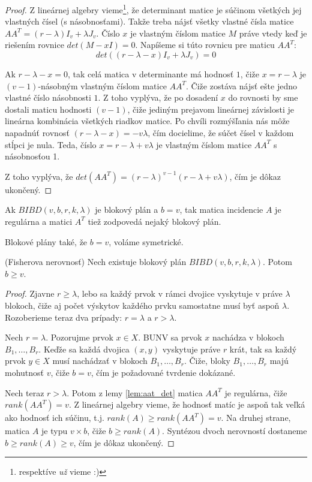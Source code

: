 \begin{proof}
Z lineárnej algebry vieme\footnote{respektíve \emph{už} vieme :)}, že determinant matice je súčinom všetkých jej vlastných čísel (s násobnosťami).
Takže treba nájsť všetky vlastné čísla matice $A A^T = (r-\lambda) I_v + \lambda J_{v}$.
Číslo $x$ je vlastným číslom matice $M$ práve vtedy keď je riešením rovnice $det(M - xI) = 0$.
Napíšeme si túto rovnicu pre maticu $AA^T$:
$$det((r-\lambda - x) I_v + \lambda J_{v}) = 0$$

Ak $r-\lambda - x = 0$, tak celá matica v determinante má hodnosť $1$, čiže $x = r - \lambda$ je $(v-1)$-násobným vlastným číslom matice $AA^T$. 
Čiže zostáva nájsť ešte jedno vlastné číslo násobnosti $1$.
Z toho vyplýva, že po dosadení $x$ do rovnosti by sme dostali maticu hodnosti $(v-1)$, čiže jediným prejavom lineárnej závislosti je lineárna kombinácia všetkých riadkov matice.
Po chvíli rozmýšľania nás môže napadnúť rovnosť $(r - \lambda - x) = - v \lambda$, čím docielime, že súčet čísel v každom stĺpci je nula.
Teda, číslo $x =r - \lambda + v\lambda $ je vlastným číslom matice $A A^T$ s násobnosťou 1.

Z toho vyplýva, že $det(AA^T) = (r - \lambda)^{v-1}(r - \lambda + v \lambda)$, čím je dôkaz ukončený.
\end{proof}

\begin{corollary}
Ak $BIBD(v, b,r, k, \lambda)$ je blokový plán a $b=v$, tak matica incidencie $A$ je regulárna a matici $A^T$ tiež zodpovedá nejaký blokový plán.
\end{corollary}

\begin{remark}
Blokové plány také, že $b = v$, voláme symetrické.
\end{remark}


\begin{theorem}{(Fisherova nerovnosť)}
Nech existuje blokový plán $BIBD(v, b,r, k, \lambda)$. Potom $b \geq v$.
\end{theorem}


\begin{proof}
Zjavne $r \geq \lambda$, lebo sa každý prvok v rámci dvojice vyskytuje v práve $\lambda$ blokoch, čiže aj počet výskytov každého prvku samostatne musí byť aspoň $\lambda$.
Rozoberieme teraz dva prípady: $r = \lambda$ a $r > \lambda$.

Nech $r = \lambda$. 
Pozorujme prvok $x \in X$.
BUNV sa prvok $x$ nachádza v blokoch $B_1, \ldots, B_r$.
Keďže sa každá dvojica $(x, y)$ vyskytuje práve $r$ krát, tak sa každý prvok $y \in X$ musí nachádzať v blokoch $B_1, \ldots, B_r$.
Čiže, bloky $B_1, \ldots, B_r$ majú mohutnosť $v$, čiže $b = v$, čím je požadované tvrdenie dokázané.

Nech teraz $r > \lambda$.
Potom z lemy \ref{lem:aat_det} matica $AA^T$ je regulárna, čiže $rank(AA^T) = v$.
Z lineárnej algebry vieme, že hodnosť matíc je aspoň tak veľká ako hodnosť ich súčinu, t.j. $rank(A) \geq rank(AA^T) = v$.
Na druhej strane, matica $A$ je typu $v \times b$, čiže $b \geq rank(A)$.
Syntézou dvoch nerovností dostaneme $b \geq rank(A) \geq v$, čím je dôkaz ukončený.
\end{proof}


